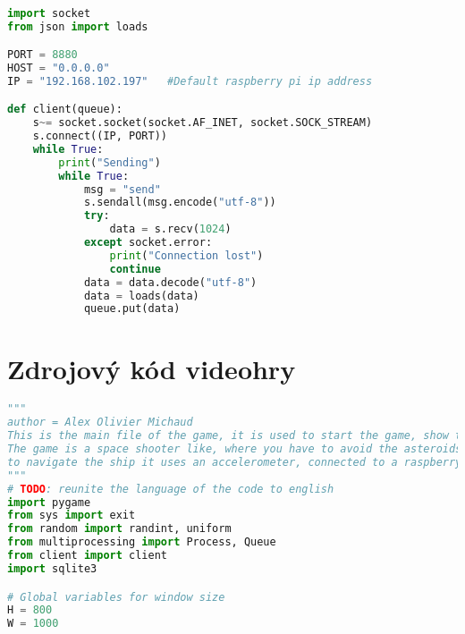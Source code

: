 \documentclass[12pt]{report}			%
\begin{document}
\begin{appendices}
\begin{lstlisting}[title={Program client.py}, caption={client.py},  label={lst:client}, language=Python]

import socket
from json import loads

PORT = 8880
HOST = "0.0.0.0"
IP = "192.168.102.197"   #Default raspberry pi ip address

def client(queue):
    s~= socket.socket(socket.AF_INET, socket.SOCK_STREAM)
    s.connect((IP, PORT))
    while True:
        print("Sending")
        while True:
            msg = "send"
            s.sendall(msg.encode("utf-8"))
            try:
                data = s.recv(1024)
            except socket.error:
                print("Connection lost")
                continue
            data = data.decode("utf-8")
            data = loads(data)
            queue.put(data)

\end{lstlisting}
	\chapter{Zdrojový kód videohry}
	
\begin{lstlisting}[title={Program hra.py}, caption={hra.py},  label={lst:hra}, language=Python]
"""
author = Alex Olivier Michaud
This is the main file of the game, it is used to start the game, show the score and exit the game.
The game is a space shooter like, where you have to avoid the asteroids
to navigate the ship it uses an accelerometer, connected to a raspberry pi
"""
# TODO: reunite the language of the code to english
import pygame
from sys import exit
from random import randint, uniform
from multiprocessing import Process, Queue
from client import client
import sqlite3

# Global variables for window size
H = 800
W = 1000


\end{lstlisting}
\end{appendices}
\end{document}
